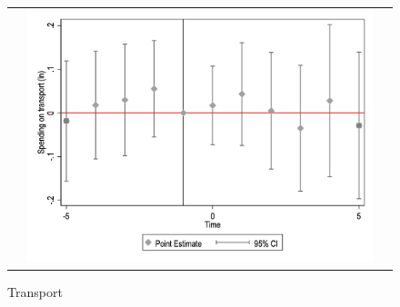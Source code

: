 \begin{figure}[ht]
\begin{tabular}{@{}ccc@{}}
\begin{minipage}[t]{0.32\textwidth}
            \label{fig:sport}
        \end{minipage} &
        \begin{minipage}[t]{0.32\textwidth}
            \centering
            \caption{Transport}
            \includegraphics[width=\linewidth]{images/pop_5000/eventdd_ln_q4_08_step1.jpg}
            \label{fig:transport}
        \end{minipage} \\[10pt]


\end{tabular}
\end{figure}
